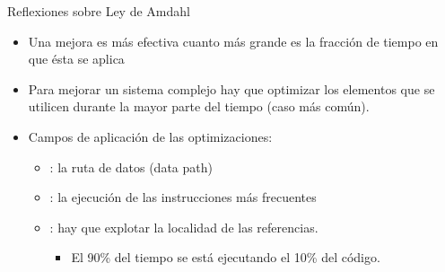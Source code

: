 \begin{frame}[t]{Reflexiones sobre Ley de Amdahl}
\begin{itemize}
  \item Una mejora es más efectiva cuanto más grande es la 
        fracción de tiempo en que ésta se aplica
  \item Para mejorar un sistema complejo hay que optimizar los elementos 
        que se utilicen durante la mayor parte del tiempo (caso más común).
  \item Campos de aplicación de las optimizaciones:
    \begin{itemize}
      \item {}: 
            la ruta de datos (data path)
      \item {}: 
            la ejecución de las instrucciones más frecuentes
      \item {}: 
            hay que explotar la localidad de las referencias.
        \begin{itemize}
          \item El 90\% del tiempo se está ejecutando el 10\% del código.
        \end{itemize}
    \end{itemize}
\end{itemize}
\end{frame}
